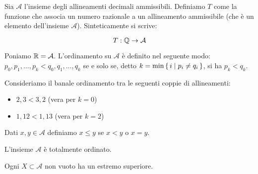 Sia $\mathcal{A}$ l'insieme degli allineamenti decimali ammissibili. Definiamo $T$ come la funzione che associa un numero razionale a un allineamento ammissibile (che è un elemento dell'insieme $\mathcal{A}$). Sinteticamente si scrive:

\begin{equation*}
T : \mathbb Q \rightarrow \mathcal{A}
\end{equation*}

Poniamo $\mathbb R = \mathcal{A}$. L'ordinamento su $\mathcal{A}$ è definito nel seguente modo: $p_0, p_1, \dots, p_k < q_0, q_1, \dots, q_k$ se e solo se, detto $k = \min \set{i | p_i \neq q_i}$, si ha $p_k < q_k$. 

\begin{example}
Consideriamo il banale ordinamento tra le seguenti coppie di allineamenti:
\begin{itemize}
\item $2,3 < 3,2$ (vera per $k = 0$)
\item $1,12 < 1,13$ (vera per $k = 2$)
\end{itemize}
\end{example}

\begin{definition}
Dati $x, y \in \mathcal{A}$ definiamo $x \le y$ se $x < y$ o $x = y$.
\end{definition}

L'insieme $\mathcal{A}$ è totalmente ordinato.

\begin{proposition}
Ogni $X \subset \mathcal{A}$ non vuoto ha un estremo superiore.
\end{proposition}

